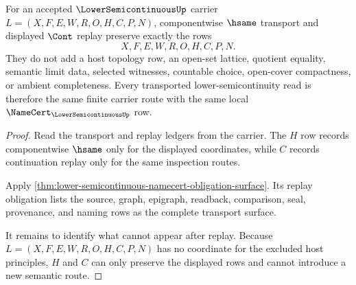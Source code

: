 \begin{theorem}
\label{thm:lowersemicontinuous-transport-replay-exactness}
For an accepted $\LowerSemicontinuousUp$ carrier
$L=(X,F,E,W,R,O,H,C,P,N)$, componentwise $\hsame$ transport and displayed
$\Cont$ replay preserve exactly the rows
$$
X,F,E,W,R,O,H,C,P,N .
$$
They do not add a host topology row, an open-set lattice, quotient equality,
semantic limit data, selected witnesses, countable choice, open-cover
compactness, or ambient completeness. Every transported lower-semicontinuity
read is therefore the same finite carrier route with the same local
$\NameCert_{\LowerSemicontinuousUp}$ row.
\end{theorem}
\begin{proof}
Read the transport and replay ledgers from the carrier. The $H$ row records
componentwise $\hsame$ only for the displayed coordinates, while $C$ records
continuation replay only for the same inspection routes.

Apply \autoref{thm:lower-semicontinuous-namecert-obligation-surface}. Its
replay obligation lists the source, graph, epigraph, readback, comparison,
seal, provenance, and naming rows as the complete transport surface.

It remains to identify what cannot appear after replay. Because
$L=(X,F,E,W,R,O,H,C,P,N)$ has no coordinate for the excluded host principles,
$H$ and $C$ can only preserve the displayed rows and cannot introduce a new
semantic route.
\end{proof}

